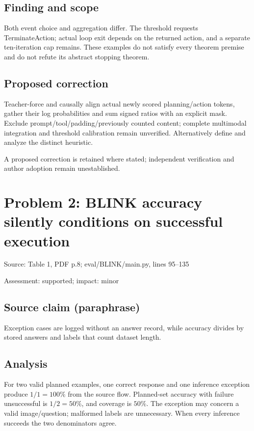 \documentclass[11pt]{article}
\begin{document}
\subsection*{Finding and scope}

Both event choice and aggregation differ. The threshold requests TerminateAction; actual loop exit depends on the returned action, and a separate ten-iteration cap remains. These examples do not satisfy every theorem premise and do not refute its abstract stopping theorem.

\subsection*{Proposed correction}

Teacher-force and causally align actual newly scored planning/action tokens, gather their log probabilities and sum signed ratios with an explicit mask. Exclude prompt/tool/padding/previously counted content; complete multimodal integration and threshold calibration remain unverified. Alternatively define and analyze the distinct heuristic.

A proposed correction is retained where stated; independent verification and author adoption remain unestablished.

\section*{Problem 2: BLINK accuracy silently conditions on successful execution}

Source: Table 1, PDF p.8; eval/BLINK/main.py, lines 95–135

Assessment: supported; impact: minor

\subsection*{Source claim (paraphrase)}

Exception cases are logged without an answer record, while accuracy divides by stored answers and labels that count dataset length.

\subsection*{Analysis}

For two valid planned examples, one correct response and one inference exception produce \(1/1=100\%\) from the source flow. Planned-set accuracy with failure unsuccessful is \(1/2=50\%\), and coverage is \(50\%\). The exception may concern a valid image/question; malformed labels are unnecessary. When every inference succeeds the two denominators agree.
\end{document}
